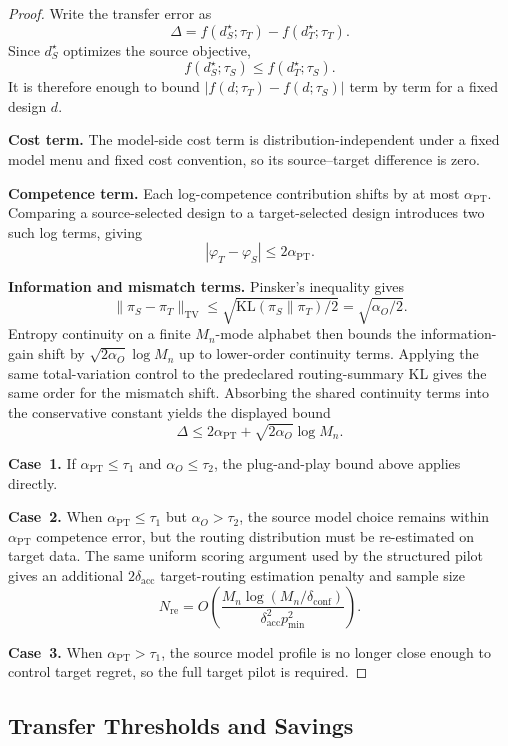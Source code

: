 \documentclass[twoside,11pt]{article}
\newcommand{\KL}{\mathrm{KL}}
\newcommand{\Mn}{M_n}
\newcommand{\pmin}{p_{\min}}
\newcommand{\dacc}{\delta_{\mathrm{acc}}}
\newcommand{\dconf}{\delta_{\mathrm{conf}}}
\begin{document}
\begin{proof}
Write the transfer error as
\[
  \Delta
  =
  f(d_S^\star;\tau_T)-f(d_T^\star;\tau_T).
\]
Since \(d_S^\star\) optimizes the source objective,
\[
  f(d_S^\star;\tau_S)\le f(d_T^\star;\tau_S).
\]
It is therefore enough to bound \(|f(d;\tau_T)-f(d;\tau_S)|\) term by term for a fixed design \(d\).

\noindent\textbf{Cost term.}
The model-side cost term is distribution-independent under a fixed model menu and fixed cost convention, so its source--target difference is zero.

\noindent\textbf{Competence term.}
Each log-competence contribution shifts by at most \(\alpha_{\mathrm{PT}}\).
Comparing a source-selected design to a target-selected design introduces two such log terms, giving
\[
  |\varphi_T-\varphi_S|\le 2\alpha_{\mathrm{PT}}.
\]

\noindent\textbf{Information and mismatch terms.}
Pinsker's inequality gives
\[
  \|\pi_S-\pi_T\|_{\mathrm{TV}}
  \le
  \sqrt{\KL(\pi_S\|\pi_T)/2}
  =
  \sqrt{\alpha_O/2}.
\]
Entropy continuity on a finite \(\Mn\)-mode alphabet then bounds the information-gain shift by
\(\sqrt{2\alpha_O}\log\Mn\) up to lower-order continuity terms.
Applying the same total-variation control to the predeclared routing-summary KL gives the same order for the mismatch shift.
Absorbing the shared continuity terms into the conservative constant yields the displayed bound
\[
  \Delta
  \le
  2\alpha_{\mathrm{PT}}+\sqrt{2\alpha_O}\log\Mn .
\]

\noindent\textbf{Case~1.}
If \(\alpha_{\mathrm{PT}}\le \tau_1\) and \(\alpha_O\le\tau_2\), the plug-and-play bound above applies directly.

\noindent\textbf{Case~2.}
When \(\alpha_{\mathrm{PT}}\le\tau_1\) but \(\alpha_O>\tau_2\), the source model choice remains within \(\alpha_{\mathrm{PT}}\) competence error, but the routing distribution must be re-estimated on target data.
The same uniform scoring argument used by the structured pilot gives an additional \(2\dacc\) target-routing estimation penalty and sample size
\[
  N_{\mathrm{re}}
  =
  O\!\left(
  \frac{\Mn\log(\Mn/\dconf)}
  {\dacc^2\pmin^2}
  \right).
\]

\noindent\textbf{Case~3.}
When \(\alpha_{\mathrm{PT}}>\tau_1\), the source model profile is no longer close enough to control target regret, so the full target pilot is required.
\end{proof}

\subsection{Transfer Thresholds and Savings}
\label{app:transfer-thresholds}
\end{document}
